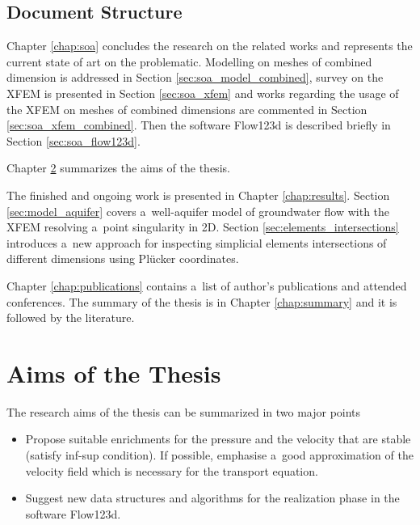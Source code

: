 \documentclass[dvipsnames,FM,Dis]{tulthesis}
\begin{document}
\section{Document Structure} \label{sec:structure}

Chapter \ref{chap:soa} concludes the research on the related works and represents the current state of art
on the problematic. Modelling on meshes of combined dimension is addressed in Section \ref{sec:soa_model_combined},
survey on the XFEM is presented in Section \ref{sec:soa_xfem} and works regarding the usage of the XFEM on
meshes of combined dimensions are commented in Section \ref{sec:soa_xfem_combined}. Then 
the software Flow123d is described briefly in Section \ref{sec:soa_flow123d}.

Chapter \ref{chap:aims} summarizes the aims of the thesis.

The finished and ongoing work is presented in Chapter \ref{chap:results}. Section \ref{sec:model_aquifer} 
covers a~well-aquifer model of groundwater flow with the XFEM resolving a~point singularity in 2D.
Section \ref{sec:elements_intersections} introduces a~new approach for inspecting simplicial elements intersections
of different dimensions using Pl{\"u}cker coordinates.

Chapter \ref{chap:publications} contains a~list of author's publications and attended conferences.
The summary of the thesis is in Chapter \ref{chap:summary} and it is followed by the literature.





\chapter{Aims of the Thesis}\label{chap:aims}


The research aims of the thesis can be summarized in two major points
\begin{itemize}
  \item Propose suitable enrichments for the pressure and the velocity that are stable (satisfy inf-sup condition). 
        If possible, emphasise a~good approximation of the velocity field which is necessary for the transport equation.
        
  \item Suggest new data structures and algorithms for the realization phase in the software Flow123d. 
\end{itemize}
\end{document}
